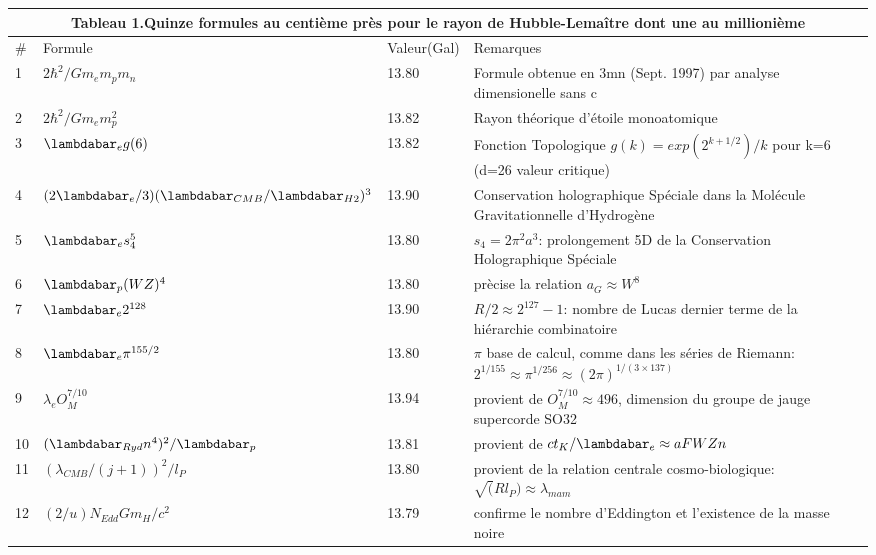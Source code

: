 \documentclass{article}
\begin{document}

\begin{table*}
  \hskip-4.5cm\begin{tabular}{llll}
    \toprule
    \multicolumn{4}{c}{Tableau 1.Quinze formules au centi\`{e}me pr\`{e}s pour le rayon de Hubble-Lema\^{i}tre dont une au millionième}\\
    \cmidrule
   \#     & Formule     & Valeur(Gal) & Remarques \\
    \midrule
    1 & $2\hbar^2/Gm_em_pm_n$ & 13.80 & Formule obtenue en 3mn (Sept. 1997) par analyse dimensionelle sans c \\
    2 & $2\hbar^2/Gm_em_p^2$ & 13.82 & Rayon th\'{e}orique d'\'{e}toile monoatomique \\
    3 & $\lambdabar_e g(6)$ & 13.82 & Fonction Topologique $g(k)=exp(2^{k+1/2})/k$ pour k=6 (d=26 valeur critique)\\
    4 & $(2\lambdabar_{e}/3)(\lambdabar_{CMB}/\lambdabar_{H2})^3$ & 13.90 & Conservation holographique Spéciale dans la Molécule Gravitationnelle d'Hydrogène \\
    5 & $\lambdabar_e s_4^5$ & 13.80 & $s_4=2\pi^2a^3$: prolongement 5D de la Conservation Holographique Spéciale \\
    6 & $\lambdabar_p (WZ)^{4}$ & 13.80 & prècise la relation $a_G \approx W^8$ \\
    7 & $\lambdabar_e 2^{128}$ & 13.90 & $R/2 \approx 2^{127}-1$: nombre de Lucas dernier terme de la hi\'{e}rarchie combinatoire \\ 
    8 & $\lambdabar_e \pi^{155/2}$ & 13.80 & $\pi$ base de calcul, comme dans les s\'{e}ries de Riemann: $2^{1/155} \approx \pi^{1/256} \approx (2\pi)^{1/(3\times 137)}$ \\
    
    9 & $\lambda_e O_M^{7/10}$ & 13.94 & provient de $O_M^{7/10} \approx 496$, dimension du groupe de jauge supercorde SO32 \\
    10 & $(\lambdabar_{Ryd} n^{4})^2/\lambdabar_p$ & 13.81 &  provient de $ct_K/\lambdabar_e \approx aFWZn$ \\ 
    11 & $(\lambda_{CMB}/(j+1))^2/l_P$ & 13.80 & provient de la relation centrale cosmo-biologique: $\sqrt(Rl_P) \approx \lambda_{mam}$ \\
    12 & $(2/u)N_{Edd}Gm_H/c^2$ & 13.79 & confirme le nombre d'Eddington et l'existence de la masse noire  \\
    

\end{tabular}
\end{table*}
\end{document}
